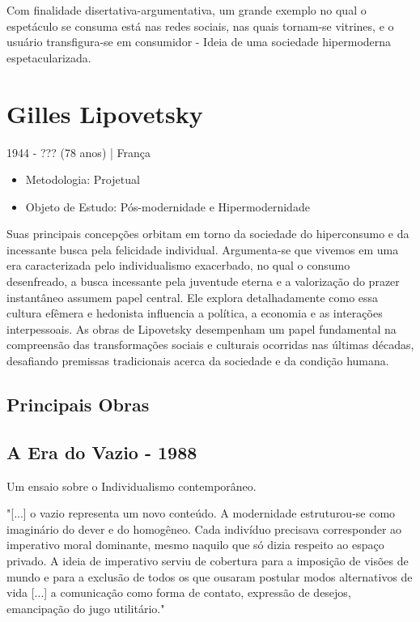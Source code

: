 \documentclass{article}
\begin{document}
Com finalidade disertativa-argumentativa, um grande exemplo no qual o espetáculo se consuma está nas redes sociais, nas quais tornam-se vitrines, e o usuário transfigura-se em consumidor - Ideia de uma sociedade hipermoderna espetacularizada.

\newpage
\section*{Gilles Lipovetsky}
\begin{flushright} 1944 - ??? (78 anos) | França \end{flushright}
\begin{itemize}
    \item Metodologia: Projetual
    \item Objeto de Estudo: Pós-modernidade e Hipermodernidade
\end{itemize}
\hspace{6mm}Suas principais concepções orbitam em torno da sociedade do hiperconsumo e da incessante busca pela felicidade individual. Argumenta-se que vivemos em uma era caracterizada pelo individualismo exacerbado, no qual o consumo desenfreado, a busca incessante pela juventude eterna e a valorização do prazer instantâneo assumem papel central. Ele explora detalhadamente como essa cultura efêmera e hedonista influencia a política, a economia e as interações interpessoais. As obras de Lipovetsky desempenham um papel fundamental na compreensão das transformações sociais e culturais ocorridas nas últimas décadas, desafiando premissas tradicionais acerca da sociedade e da condição humana.

\subsection*{Principais Obras}


\subsection*{A Era do Vazio - 1988}
Um ensaio sobre o Individualismo contemporâneo.


"[...] o vazio representa um novo conteúdo. A modernidade estruturou-se como imaginário do 
dever e do homogêneo. Cada indivíduo precisava corresponder ao imperativo moral 
dominante, mesmo naquilo que só dizia respeito ao espaço privado. A ideia de imperativo 
serviu de cobertura para a imposição de visões de mundo e para a exclusão de todos os que 
ousaram postular modos alternativos de vida [...] a comunicação como forma de contato, 
expressão de desejos, emancipação do jugo utilitário."
\end{document}
